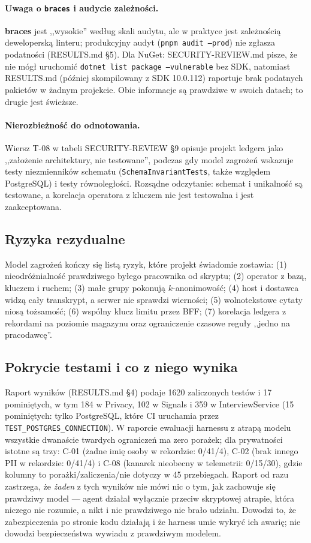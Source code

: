 \paragraph{Uwaga o \texttt{braces} i audycie zależności.} \textbf{braces} jest
,,wysokie'' według skali audytu, ale w praktyce jest zależnością deweloperską
linteru; produkcyjny audyt (\texttt{pnpm audit --prod}) nie zgłasza podatności
(RESULTS.md §5). Dla NuGet: SECURITY-REVIEW.md pisze, że nie mógł uruchomić
\texttt{dotnet list package --vulnerable} bez SDK, natomiast RESULTS.md (później
skompilowany z SDK 10.0.112) raportuje brak podatnych pakietów w żadnym
projekcie. Obie informacje są prawdziwe w swoich datach; to drugie jest świeższe.

\paragraph{Nierozbieżność do odnotowania.} Wiersz T-08 w tabeli
SECURITY-REVIEW §9 opisuje projekt ledgera jako ,,założenie architektury, nie testowane'',
podczas gdy model zagrożeń wskazuje testy niezmienników schematu
(\texttt{SchemaInvariantTests}, także względem PostgreSQL) i testy równoległości. Rozsądne
odczytanie: schemat i unikalność są testowane, a korelacja operatora z kluczem nie jest
testowalna i jest zaakceptowana.

\subsection{Ryzyka rezydualne}

Model zagrożeń kończy się listą ryzyk, które projekt świadomie zostawia: (1)
nieodróżnialność prawdziwego byłego pracownika od skryptu; (2) operator z bazą, kluczem i
ruchem; (3) małe grupy pokonują $k$-anonimowość; (4) host i dostawca widzą cały
transkrypt, a serwer nie sprawdzi wierności; (5) wolnotekstowe cytaty niosą
tożsamość; (6) wspólny klucz limitu przez BFF; (7) korelacja ledgera z rekordami na
poziomie magazynu oraz ograniczenie czasowe reguły ,,jedno na pracodawcę''.

\subsection{Pokrycie testami i co z niego wynika}

Raport wyników (RESULTS.md §4) podaje 1620 zaliczonych testów i 17 pominiętych, w tym
184 w Privacy, 102 w Signals i 359 w InterviewService (15 pominiętych: tylko PostgreSQL,
które CI uruchamia przez \texttt{TEST\_POSTGRES\_CONNECTION}). W raporcie ewaluacji
harnessu z atrapą modelu wszystkie dwanaście twardych ograniczeń ma zero porażek;
dla prywatności istotne są trzy: C-01 (żadne imię osoby w rekordzie: 0/41/4), C-02 (brak
innego PII w rekordzie: 0/41/4) i C-08 (kanarek nieobecny w telemetrii: 0/15/30), gdzie
kolumny to porażki/zaliczenia/nie dotyczy w 45 przebiegach. Raport od razu zastrzega, że \emph{żaden}
z tych wyników nie mówi nic o tym, jak zachowuje się prawdziwy model --- agent działał
wyłącznie przeciw skryptowej atrapie, która niczego nie rozumie, a nikt i nic prawdziwego nie
brało udziału. Dowodzi to, że zabezpieczenia po stronie kodu działają i że harness
umie wykryć ich awarię; nie dowodzi bezpieczeństwa wywiadu z prawdziwym modelem.


